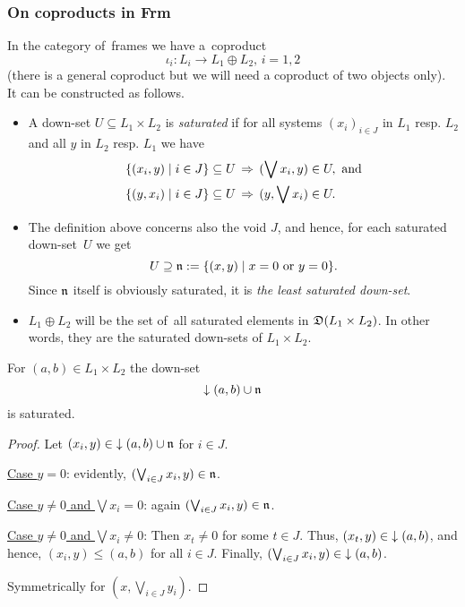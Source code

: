 \subsubsection*{On coproducts in Frm}

In the category of~frames we have a~coproduct
\[
  \iota_i: L_i \to L_1 \oplus L_2, \, i = 1, 2
\]
(there is a general coproduct but we will need a coproduct of two objects
 only).
It can be constructed as follows.

\begin{itemize}
\item A down-set $U\subseteq L_1 \times L_2$ is \emph{saturated\/} if for all
systems $(x_i)_{i\in J}$ in $L_1$ resp. $L_2$ and all $y$ in $L_2$ resp. $L_1$
we have \label{df:satur}
  \begin{align*}
    \{ (x_i, y) \mid i\in J \} \subseteq U \, &\Rightarrow \, (\bigvee x_i, y)\in U,
    \text{ and} \\
    \{ (y, x_i) \mid i\in J \} \subseteq U \, &\Rightarrow \, (y, \bigvee x_i)\in U.
  \end{align*}

\item The definition above concerns also the void $J$, and hence, for each
saturated down-set~$U$ we get
\[
  U\supseteq \mathfrak{n} := \{ (x, y) \mid x = 0 \text{ or } y = 0 \}.
\]
Since $\mathfrak{n}$ itself is obviously saturated, it is \emph{the least saturated
down-set\/}.

\item $L_1 \oplus L_2$ will be the set of~all saturated elements in $\mathfrak{D}(L_1
\times L_2)$.
In other words, they are the saturated down-sets of $L_1 \times L_2$.
\end{itemize}

\begin{prop*}
For $(a, b)\in L_1 \times L_2$ the down-set
\[
  \left\downarrow\right. (a, b) \cup \mathfrak{n}
\]
is saturated.
\end{prop*}
\begin{proof}
  Let $(x_i, y)\in \left\downarrow\right. (a, b) \cup \mathfrak{n}$ for $i\in J$.

  \underline{Case $y = 0$}:
  evidently, $(\bigvee_{i\in J} x_i, y) \in \mathfrak{n}$.

  \underline{Case $y \ne 0$ and $\bigvee x_i = 0$}:
  again $(\bigvee_{i\in J} x_i, y) \in \mathfrak{n}$.

  \underline{Case $y \ne 0$ and $\bigvee x_i \ne 0$}:
  Then $x_t \ne 0$ for some $t\in J$.
  Thus, $(x_t, y)\in \left\downarrow\right. (a, b)$, and hence, $(x_i, y) \le (a, b)$ for all
  $i\in J$.
  Finally, $(\bigvee_{i\in J} x_i, y) \in \left\downarrow\right. (a, b)$.

  Symmetrically for $(x, \bigvee_{i\in J} y_i)$.
\end{proof}


